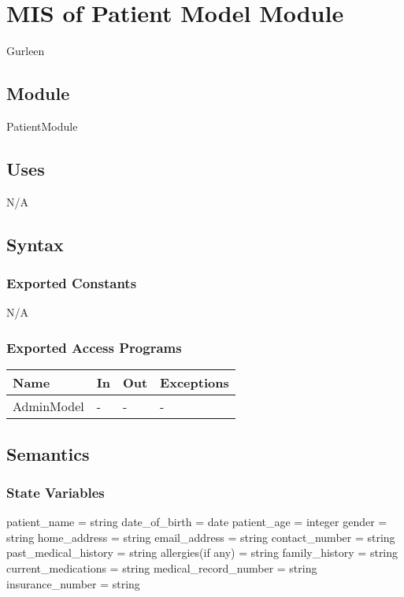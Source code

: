 \documentclass[12pt, titlepage]{article}
\begin{document}
\newpage

\section{MIS of Patient Model Module } \label{Patient_Model_Module} Gurleen

\subsection{Module}

PatientModule

\subsection{Uses}

N/A

\subsection{Syntax}

\subsubsection{Exported Constants}

N/A

\subsubsection{Exported Access Programs}

\begin{center}
\begin{tabular}{p{3cm} p{4cm} p{4cm} p{3.5cm}}
\hline
\textbf{Name} & \textbf{In} & \textbf{Out} & \textbf{Exceptions} \\
\hline
AdminModel & - & - & - & \\ 
\hline
\end{tabular}
\end{center}

\subsection{Semantics}

\subsubsection{State Variables}

patient_name = string
date_of_birth = date
patient_age = integer
gender = string
home_address = string
email_address = string
contact_number = string
past_medical_history = string
allergies(if any) = string
family_history = string
current_medications = string
medical_record_number = string
insurance_number = string
\end{document}
